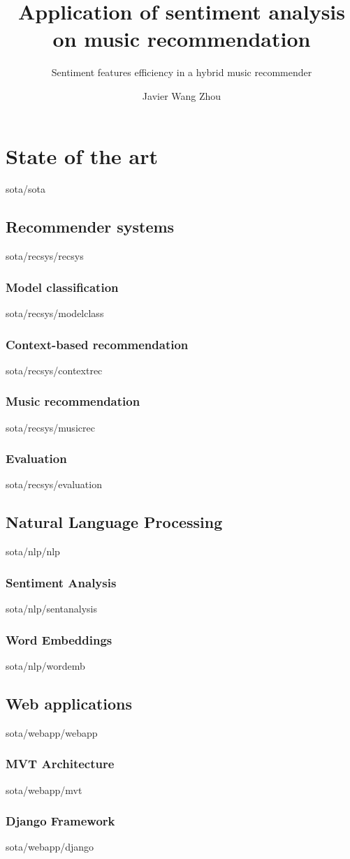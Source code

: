 \documentclass[english,epsbased,copyright,final,printable,covers,extendedindex,firstnumbered,tfg,gnuplot]{tfgtfmthesisuam}
\title{Application of sentiment analysis on music recommendation}
\subtitle{Sentiment features efficiency in a hybrid music recommender}
\author{Javier Wang Zhou}
\begin{document}
\chapter{State of the art\label{CAP:STATE_OF_THE_ART}}{sota/sota}
  \section{Recommender systems\label{SEC:RECSYS}}{sota/recsys/recsys}
    \subsection{Model classification\label{SS:MODELCLASS}}{sota/recsys/modelclass}
    \subsection{Context-based recommendation\label{SS:CONTEXTREC}}{sota/recsys/contextrec}
    \subsection{Music recommendation\label{SS:MUSICREC}}{sota/recsys/musicrec}
    \subsection{Evaluation\label{SS:EVALUATION}}{sota/recsys/evaluation}
  \section{Natural Language Processing\label{SEC:NLP}}{sota/nlp/nlp}
    \subsection{Sentiment Analysis\label{SS:SENTANALYSIS}}{sota/nlp/sentanalysis}
    \subsection{Word Embeddings\label{SS:WORDEMB}}{sota/nlp/wordemb}
  \section{Web applications\label{SEC:WEBAPP}}{sota/webapp/webapp}
    \subsection{MVT Architecture\label{SS:MVT}}{sota/webapp/mvt}
    \subsection{Django Framework\label{SS:DJANGO}}{sota/webapp/django}
\end{document}
